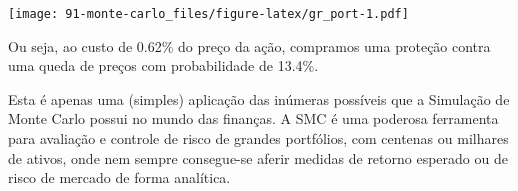 \documentclass[]{book}
\newenvironment{Shaded}{\begin{snugshade}}{\end{snugshade}}
\newcommand{\KeywordTok}[1]{\textcolor[rgb]{0.13,0.29,0.53}{\textbf{#1}}}
\newcommand{\DataTypeTok}[1]{\textcolor[rgb]{0.13,0.29,0.53}{#1}}
\newcommand{\DecValTok}[1]{\textcolor[rgb]{0.00,0.00,0.81}{#1}}
\newcommand{\StringTok}[1]{\textcolor[rgb]{0.31,0.60,0.02}{#1}}
\newcommand{\OtherTok}[1]{\textcolor[rgb]{0.56,0.35,0.01}{#1}}
\newcommand{\OperatorTok}[1]{\textcolor[rgb]{0.81,0.36,0.00}{\textbf{#1}}}
\newcommand{\NormalTok}[1]{#1}
\theoremstyle{definition}
\theoremstyle{definition}
\theoremstyle{definition}
\theoremstyle{remark}
\begin{document}
\begin{Shaded}
\end{Shaded}

\texttt{[image: 91-monte-carlo\_files/figure-latex/gr\_port-1.pdf]}

Ou seja, ao custo de 0.62\% do preço da ação, compramos uma proteção
contra uma queda de preços com probabilidade de 13.4\%.

Esta é apenas uma (simples) aplicação das inúmeras possíveis que a
Simulação de Monte Carlo possui no mundo das finanças. A SMC é uma
poderosa ferramenta para avaliação e controle de risco de grandes
portfólios, com centenas ou milhares de ativos, onde nem sempre
consegue-se aferir medidas de retorno esperado ou de risco de mercado de
forma analítica.


\end{document}
